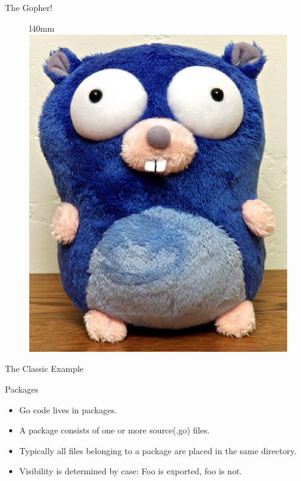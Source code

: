 \documentclass{beamer}
\begin{document}
    \begin{frame}{The Gopher!}
        \begin{figure}{l}{40mm}
            \includegraphics[scale=0.5]{images/gopher.eps}
        \end{figure}
    \end{frame}

    \begin{frame}{The Classic Example}
        
    \end{frame}

    \begin{frame}{Packages}
        \begin{itemize}
            \item Go code lives in packages.\\
            \item A package consists of one or more source(.go) files.\\
            \item Typically all files belonging to a package are placed in the same directory.
            \item Visibility is determined by case: Foo is exported, foo is not.
        \end{itemize}
    \end{frame}
\end{document}
